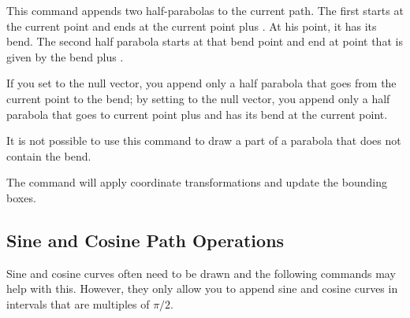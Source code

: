 \begin{command}{\pgfpathparabola{}}
  This command appends two half-parabolas to the  current path. The
  first starts at the current point and ends at the current point plus
  . At his point, it has its bend. The second half
  parabola starts at that bend point and end at point that is given by
  the bend plus .

  If you set  to the null vector, you append only a
  half parabola that goes from the current point to the bend; by
  setting  to the null vector, you append only a
  half parabola that goes to current point plus  and
  has its bend at the current point.

  It is not possible to use this command to draw a part of a parabola
  that does not contain the bend.

\begin{codeexample}[]
\begin{pgfpicture}
  \pgfpathmoveto{\pgfpointorigin}
  \pgfpathparabola{\pgfpointorigin}{\pgfpoint{2cm}{4cm}}
  \color{red}

  \pgfpathmoveto{\pgfpointorigin}
  \pgfpathparabola{\pgfpoint{-2cm}{4cm}}{\pgfpointorigin}
  \color{blue}

  \pgfpathmoveto{\pgfpoint{-2cm}{2cm}}
  \pgfpathparabola{\pgfpoint{1cm}{-1cm}}{\pgfpoint{2cm}{4cm}}
  \color{orange}
\end{pgfpicture}
\end{codeexample}
  The command will apply coordinate transformations and update the
  bounding boxes.
\end{command}


\subsection{Sine and Cosine Path Operations}

Sine and cosine curves often need to be drawn and the following commands
may help with this. However, they only allow you to append sine and
cosine curves in intervals that are multiples of $\pi/2$.

